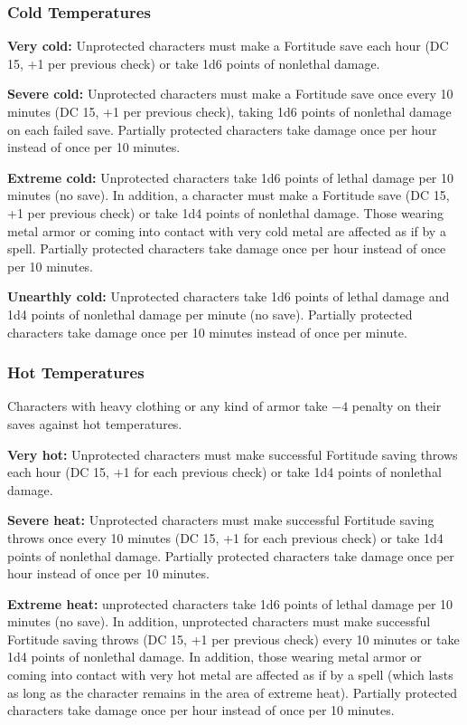 \subsubsection{Cold Temperatures}
\textbf{Very cold:} Unprotected characters must make a Fortitude save each hour (DC 15, +1 per previous check) or take 1d6 points of nonlethal damage. 

\textbf{Severe cold:} Unprotected characters must make a Fortitude save once every 10 minutes (DC 15, +1 per previous check), taking 1d6 points of nonlethal damage on each failed save. Partially protected characters take damage once per hour instead of once per 10 minutes.

\textbf{Extreme cold:} Unprotected characters take 1d6 points of lethal damage per 10 minutes (no save). In addition, a character must make a Fortitude save (DC 15, +1 per previous check) or take 1d4 points of nonlethal damage. Those wearing metal armor or coming into contact with very cold metal are affected as if by a  spell. Partially protected characters take damage once per hour instead of once per 10 minutes.

\textbf{Unearthly cold:} Unprotected characters take 1d6 points of lethal damage and 1d4 points of nonlethal damage per minute (no save). Partially protected characters take damage once per 10 minutes instead of once per minute.

\subsubsection{Hot Temperatures}
Characters with heavy clothing or any kind of armor take $-4$ penalty on their saves against hot temperatures.

\textbf{Very hot:} Unprotected characters must make successful Fortitude saving throws each hour
(DC 15, +1 for each previous check) or take 1d4 points of nonlethal damage.

\textbf{Severe heat:} Unprotected characters must make successful Fortitude saving throws once every 10 minutes (DC 15, +1 for each previous check) or take 1d4 points of nonlethal damage. Partially protected characters take damage once per hour instead of once per 10 minutes.

\textbf{Extreme heat:} unprotected characters take 1d6 points of lethal damage per 10 minutes (no save). In addition, unprotected characters must make successful Fortitude saving throws (DC 15, +1 per previous check) every 10 minutes or take 1d4 points of nonlethal damage. In addition, those wearing metal armor or coming into contact with very hot metal are affected as if by a  spell (which lasts as long as the character remains in the area of extreme heat). Partially protected characters take damage once per hour instead of once per 10 minutes.

